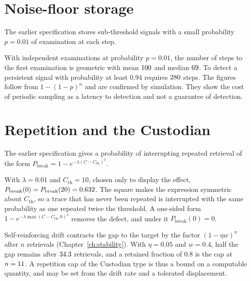 \section{Noise-floor storage}

The earlier specification stores sub-threshold signals with a small probability $p=0.01$ of examination at each step.

\begin{workedex}\label{ex:peek}
With independent examinations at probability $p=0.01$, the number of steps to the first examination is geometric with mean $100{}$ and median $69{}$. To detect a persistent signal with probability at least $0.94$ requires $280{}$ steps. The figures follow from $1-(1-p)^n$ and are confirmed by simulation. They show the cost of periodic sampling as a latency to detection and not a guarantee of detection.
\end{workedex}

\section{Repetition and the Custodian}\label{sec:july-custodian}

The earlier specification gives a probability of interrupting repeated retrieval of the form $P_{\mathrm{break}}=1-e^{-\lambda(C-C_{\mathrm{th}})^2}$.

\begin{counterex}\label{cex:pbreak}
With $\lambda=0.01$ and $C_{\mathrm{th}}=10$, chosen only to display the effect, $P_{\mathrm{break}}(0)=P_{\mathrm{break}}(20)=0.632{}$. The square makes the expression symmetric about $C_{\mathrm{th}}$, so a trace that has never been repeated is interrupted with the same probability as one repeated twice the threshold. A one-sided form $1-e^{-\lambda\max(C-C_{\mathrm{th}},0)^2}$ removes the defect, and under it $P_{\mathrm{break}}(0)=0$.
\end{counterex}

\begin{extension}\label{ext:rep-cap}
Self-reinforcing drift contracts the gap to the target by the factor $(1-\eta w)^n$ after $n$ retrievals (Chapter~\ref{ch:stability}). With $\eta=0.05$ and $w=0.4$, half the gap remains after $34.3{}$ retrievals, and a retained fraction of $0.8$ is the cap at $n=11{}$. A repetition cap of the Custodian type is thus a bound on a computable quantity, and may be set from the drift rate and a tolerated displacement.
\end{extension}

